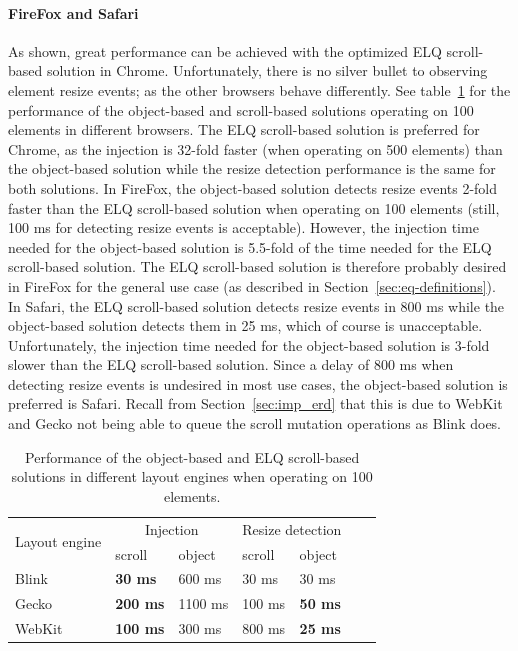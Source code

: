 \documentclass[a4paper,11pt]{kth-mag}
\begin{document}
        \paragraph{FireFox and Safari}
        As shown, great performance can be achieved with the optimized \gls{ELQ} scroll-based solution in Chrome.
        Unfortunately, there is no silver bullet to observing element resize events; as the other \glspl{browser} behave differently.
        See table~\ref{table:erd-layout-engines} for the performance of the object-based and scroll-based solutions operating on 100 \glspl{element} in different \glspl{browser}.
        The \gls{ELQ} scroll-based solution is preferred for Chrome, as the injection is 32-fold faster (when operating on 500 \glspl{element}) than the object-based solution while the resize detection performance is the same for both solutions.
        In FireFox, the object-based solution detects resize events 2-fold faster than the \gls{ELQ} scroll-based solution when operating on 100 \glspl{element} (still, 100 ms for detecting resize events is acceptable).
        However, the injection time needed for the object-based solution is 5.5-fold of the time needed for the \gls{ELQ} scroll-based solution.
        The \gls{ELQ} scroll-based solution is therefore probably desired in FireFox for the general use case (as described in Section~\ref{sec:eq-definitions}).
        In Safari, the \gls{ELQ} scroll-based solution detects resize events in 800 ms while the object-based solution detects them in 25 ms, which of course is unacceptable.
        Unfortunately, the injection time needed for the object-based solution is 3-fold slower than the \gls{ELQ} scroll-based solution.
        Since a delay of 800 ms when detecting resize events is undesired in most use cases, the object-based solution is preferred is Safari.
        Recall from Section~\ref{sec:imp_erd} that this is due to WebKit and Gecko not being able to queue the scroll mutation operations as Blink does.
        \begin{table}[ht]\center
          \tiny
          \begin{tabular}[t]{ l l l l l l l }
            \multirow{2}{*}{Layout engine} & \multicolumn{2}{c}{Injection} & \multicolumn{2}{c}{Resize detection} \\
            & scroll & object & scroll & object \\
            \hline
            \gls{Blink}   & \textbf{30 ms}   & 600 ms    & 30 ms   & 30 ms           \\
            \gls{Gecko}   & \textbf{200 ms}  & 1100 ms   & 100 ms  & \textbf{50 ms}  \\
            \gls{WebKit}  & \textbf{100 ms}  & 300 ms    & 800 ms  & \textbf{25 ms}  \\
          \end{tabular}
          \caption{Performance of the object-based and \gls{ELQ} scroll-based solutions in different \glspl{layout engine} when operating on 100 \glspl{element}.}
          \label{table:erd-layout-engines}
        \end{table}
\end{document}

